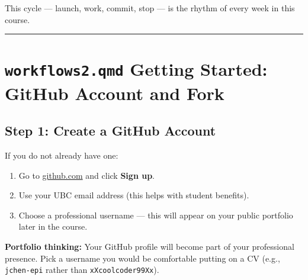 \documentclass[
  letterpaper,
  DIV=11,
  numbers=noendperiod,
  oneside]{scrreprt}
\providecommand{\tightlist}{%
  \setlength{\itemsep}{0pt}\setlength{\parskip}{0pt}}
\begin{document}
This cycle --- launch, work, commit, stop --- is the rhythm of every
week in this course.

\begin{center}\rule{0.5\linewidth}{0.5pt}\end{center}

\section*{\texorpdfstring{\texttt{workflows2.qmd} Getting Started:
GitHub Account and
Fork}{workflows2.qmd Getting Started: GitHub Account and Fork}}\label{workflows2.qmd-getting-started-github-account-and-fork}


\subsection*{Step 1: Create a GitHub
Account}\label{step-1-create-a-github-account}

If you do not already have one:

\begin{enumerate}
\def\labelenumi{\arabic{enumi}.}
\tightlist
\item
  Go to \href{https://github.com}{github.com} and click \textbf{Sign
  up}.
\item
  Use your UBC email address (this helps with student benefits).
\item
  Choose a professional username --- this will appear on your public
  portfolio later in the course.
\end{enumerate}

\begin{tcolorbox}[enhanced jigsaw, opacitybacktitle=0.6, colbacktitle=quarto-callout-tip-color!10!white, breakable, opacityback=0, coltitle=black, toptitle=1mm, bottomrule=.15mm, colframe=quarto-callout-tip-color-frame, bottomtitle=1mm, colback=white, leftrule=.75mm, rightrule=.15mm, title=\textcolor{quarto-callout-tip-color}{\faLightbulb}\hspace{0.5em}{Tip}, left=2mm, arc=.35mm, toprule=.15mm, titlerule=0mm]

\textbf{Portfolio thinking:} Your GitHub profile will become part of
your professional presence. Pick a username you would be comfortable
putting on a CV (e.g., \texttt{jchen-epi} rather than
\texttt{xXcoolcoder99Xx}).

\end{tcolorbox}
\end{document}
